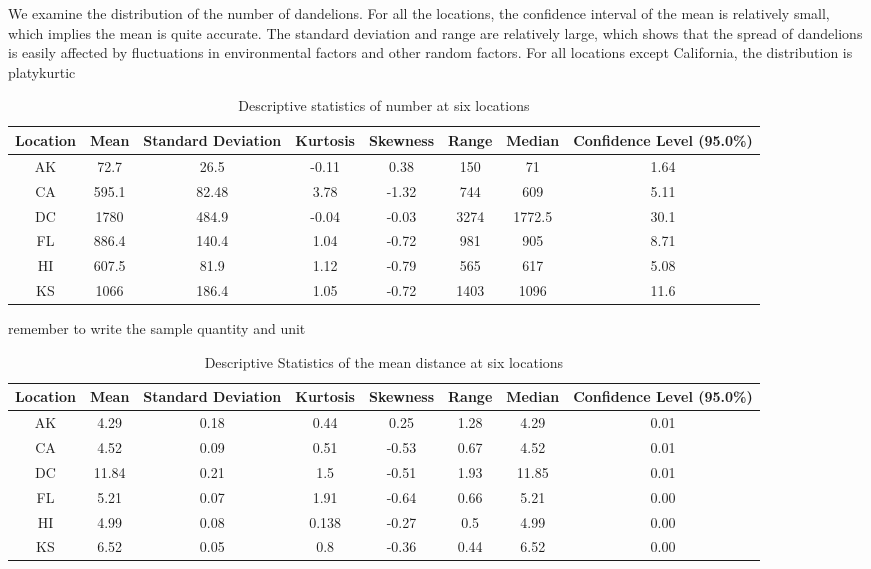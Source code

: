 \documentclass[12pt]{article}
\begin{document}
			We examine the distribution of the number of dandelions.  For all the locations, the confidence interval of the mean is relatively small, which implies the mean is quite accurate.  The standard deviation and range are relatively large, which shows that the spread of dandelions is easily affected by fluctuations in environmental factors and other random factors.  For all locations except California, the distribution is platykurtic
			
			{
				\fontsize{10}{14}\selectfont
				{
					\begin{longtable}{cccccccc}
						\caption{Descriptive statistics of number at six locations}
						\label{tb:numDistribution}\\
						\toprule
						Location&Mean&Standard Deviation&Kurtosis&Skewness&Range&Median&Confidence Level (95.0\%)\\
						\toprule
						AK&72.7&26.5&-0.11&0.38&150&71&1.64\\
						CA&595.1&82.48&3.78&-1.32&744&609&5.11\\
						DC&1780&484.9&-0.04&-0.03&3274&1772.5&30.1\\
						FL&886.4&140.4&1.04&-0.72&981&905&8.71\\
						HI&607.5&81.9&1.12&-0.79&565&617&5.08\\
						KS&1066&186.4&1.05&-0.72&1403&1096&11.6\\
						\bottomrule
					\end{longtable}
				}
			}
			
			remember to write the sample quantity and unit \\
			
			{
				\fontsize{10}{14}\selectfont
				{
					\begin{longtable}{cccccccc}
						\caption{Descriptive Statistics of the mean distance at six locations}
						\label{tb:distDistribution}\\
						\toprule
						Location&Mean&Standard Deviation&Kurtosis&Skewness&Range&Median&Confidence Level (95.0\%)\\
						\toprule
						AK&4.29&0.18&0.44&0.25&1.28&4.29&0.01\\
						CA&4.52&0.09&0.51&-0.53&0.67&4.52&0.01\\
						DC&11.84&0.21&1.5&-0.51&1.93&11.85&0.01\\
						FL&5.21&0.07&1.91&-0.64&0.66&5.21&0.00\\
						HI&4.99&0.08&0.138&-0.27&0.5&4.99&0.00\\
						KS&6.52&0.05&0.8&-0.36&0.44&6.52&0.00\\
						\bottomrule
					\end{longtable}
				}
			}
			
\end{document}
